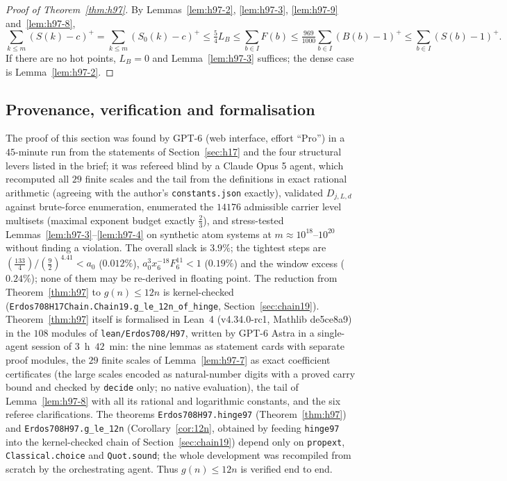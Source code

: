 \begin{proof}[Proof of Theorem~\ref{thm:h97}]
By Lemmas~\ref{lem:h97-2}, \ref{lem:h97-3}, \ref{lem:h97-9} and~\ref{lem:h97-8},
\[
\sum_{k\le m}(S(k)-c)^+=\sum_{k\le m}(S_0(k)-c)^+\le\tfrac54L_B\le\sum_{b\in I}F(b)
\le\tfrac{969}{1000}\sum_{b\in I}(B(b)-1)^+\le\sum_{b\in I}(S(b)-1)^+ .
\]
If there are no hot points, $L_B=0$ and Lemma~\ref{lem:h97-3} suffices; the dense case is Lemma~\ref{lem:h97-2}.
\end{proof}

\subsection*{Provenance, verification and formalisation}
The proof of this section was found by GPT-6 (web interface, effort ``Pro'') in a $45$-minute run from the
statements of Section~\ref{sec:h17} and the four structural levers listed in the brief; it was refereed blind by a
Claude Opus 5 agent, which recomputed all $29$ finite scales and the tail from the definitions in exact rational
arithmetic (agreeing with the author's \texttt{constants.json} exactly), validated $D_{j,L,d}$ against brute-force
enumeration, enumerated the $14176$ admissible carrier level multisets (maximal exponent budget exactly $\tfrac23$),
and stress-tested Lemmas~\ref{lem:h97-3}--\ref{lem:h97-4} on synthetic atom systems at $m\approx10^{18}$--$10^{20}$
without finding a violation. The overall slack is $3.9\%$; the tightest steps are $(\tfrac{133}4)/(\tfrac92)^{4.41}<a_0$
($0.012\%$), $a_0^3x_6^{-18}F_6^{11}<1$ ($0.19\%$) and the window excess ($0.24\%$); none of them may be re-derived
in floating point. The reduction from Theorem~\ref{thm:h97} to $g(n)\le12n$ is kernel-checked
(\texttt{Erdos708H17Chain.Chain19.g\_le\_12n\_of\_hinge}, Section~\ref{sec:chain19}). Theorem~\ref{thm:h97} itself is formalised in Lean~4 (v4.34.0-rc1, Mathlib de5ce8a9) in the $108$ modules of
\texttt{lean/Erdos708/H97}, written by GPT-6 Astra in a single-agent session of $3$~h~$42$~min: the nine lemmas as statement
cards with separate proof modules, the $29$ finite scales of Lemma~\ref{lem:h97-7} as exact coefficient certificates
(the large scales encoded as natural-number digits with a proved carry bound and checked by \texttt{decide} only; no
native evaluation), the tail of Lemma~\ref{lem:h97-8} with all its rational and logarithmic constants, and the six
referee clarifications. The theorems \texttt{Erdos708H97.hinge97} (Theorem~\ref{thm:h97}) and
\texttt{Erdos708H97.g\_le\_12n} (Corollary~\ref{cor:12n}, obtained by feeding \texttt{hinge97} into the
kernel-checked chain of Section~\ref{sec:chain19}) depend only on \texttt{propext}, \texttt{Classical.choice} and
\texttt{Quot.sound}; the whole development was recompiled from scratch by the orchestrating agent. Thus $g(n)\le12n$
is verified end to end.
